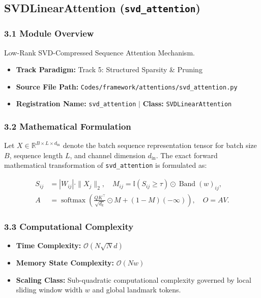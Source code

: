 \subsection{SVDLinearAttention (\texttt{svd\_attention})}
\label{sec:app_module_svd_attention}

\subsubsection*{3.1 Module Overview}
Low-Rank SVD-Compressed Sequence Attention Mechanism.
\begin{itemize}
    \item \textbf{Track Paradigm:} Track 5: Structured Sparsity \& Pruning
    \item \textbf{Source File Path:} \texttt{Codes/framework/attentions/svd\_attention.py}
    \item \textbf{Registration Name:} \texttt{svd\_attention} $\mid$ \textbf{Class:} \texttt{SVDLinearAttention}
\end{itemize}

\subsubsection*{3.2 Mathematical Formulation}
Let $X \in \mathbb{R}^{B \times L \times d_{\text{in}}}$ denote the batch sequence representation tensor for batch size $B$, sequence length $L$, and channel dimension $d_{\text{in}}$. The exact forward mathematical transformation of \texttt{svd\_attention} is formulated as:

\begin{align}
S_{ij} &= |W_{ij}| \cdot \|X_j\|_2, \quad M_{ij} = \mathbb{I}(S_{ij} \ge \tau) \odot \operatorname{Band}(w)_{ij}, \\
A &= \operatorname{softmax}\left(\frac{Q K^\top}{\sqrt{d_k}} \odot M + (1 - M)(-\infty)\right), \quad O = A V.
\end{align}


\subsubsection*{3.3 Computational Complexity}
\begin{itemize}
    \item \textbf{Time Complexity:} $\mathcal{O}(N \sqrt{N} d)$
    \item \textbf{Memory State Complexity:} $\mathcal{O}(N w)$
    \item \textbf{Scaling Class:} Sub-quadratic computational complexity governed by local sliding window width $w$ and global landmark tokens.
\end{itemize}

